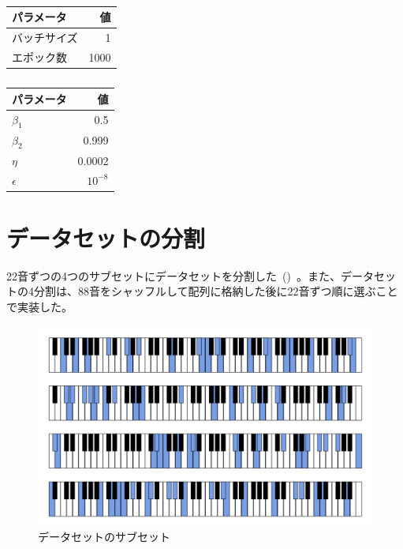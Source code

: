 \begin{table}[h]
\centering
\begin{minipage}{0.49\columnwidth}
    \centering
        \begin{tabular}{lr}\toprule
            パラメータ & 値 \\ \midrule
            バッチサイズ & 1 \\ 
            エポック数 & 1000 \\ \bottomrule
        \end{tabular}
    \caption{}
    \label{tab:params1}
\end{minipage}
\begin{minipage}{0.49\columnwidth}
    \centering
        \begin{tabular}{lr}\toprule
            パラメータ & 値 \\ \midrule
            $\beta_1$ & 0.5 \\
            $\beta_2$ & 0.999 \\
            $\eta$ & 0.0002 \\ 
            $\epsilon$ & $10^{-8}$ \\ \bottomrule
        \end{tabular}
    \caption{}
    \label{tab:params2}
\end{minipage}
\end{table}

\chapter{データセットの分割}
\label{app:split}

22音ずつの4つのサブセットにデータセットを分割した~()~。また、データセットの4分割は、88音をシャッフルして配列に格納した後に22音ずつ順に選ぶことで実装した。

\begin{figure}[h]
\centering
\includegraphics[width=\columnwidth]{figure/data_div.png}
\caption{データセットのサブセット}
\label{fig:data_div}
\end{figure}

